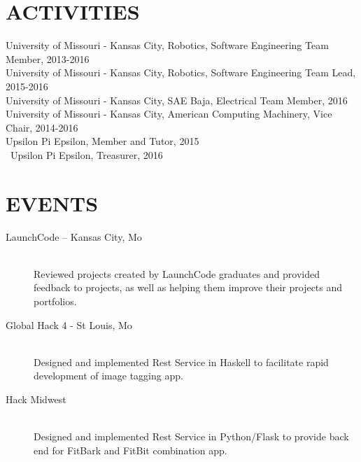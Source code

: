 \documentclass[margin,10pt]{res} %
\begin{document}
\begin{resume}
 
\section{ACTIVITIES}
University of Missouri - Kansas City, Robotics, Software Engineering Team Member, 2013-2016 \\
University of Missouri - Kansas City, Robotics, Software Engineering Team Lead, 2015-2016 \\
University of Missouri - Kansas City, SAE Baja, Electrical Team Member, 2016 \\
University of Missouri - Kansas City, American Computing Machinery, Vice Chair, 2014-2016\\
Upsilon Pi Epsilon, Member and Tutor, 2015 \\\
Upsilon Pi Epsilon, Treasurer, 2016

\section{EVENTS}
\begin{description}
\item [LaunchCode -- Kansas City, Mo] \hfill \\
	Reviewed projects created by LaunchCode graduates and provided feedback to projects, as well as helping them improve their projects and portfolios.

\item [Global Hack 4 - St Louis, Mo] \hfill \\
   Designed and implemented Rest Service in Haskell to facilitate rapid development of image tagging app.

\item [Hack Midwest] \hfill \\
  Designed and implemented Rest Service in Python/Flask to provide back end for FitBark and FitBit combination app.
\end{description}
\end{resume} 
\end{document}
